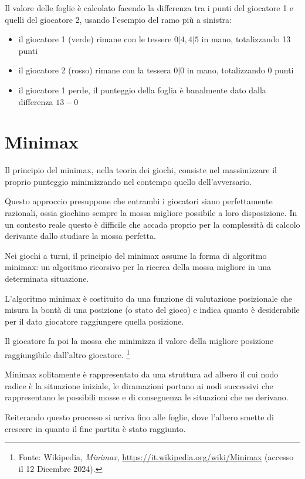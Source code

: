 \documentclass[a4paper,12pt]{report}
\begin{document}
Il valore delle foglie è calcolato facendo la differenza tra i punti del giocatore 1 e quelli del giocatore 2, usando l'esempio del ramo più a sinistra:

\begin{itemize}
    \item il giocatore 1 (verde) rimane con le tessere \( 0|4, 4|5\) in mano, totalizzando 13 punti
    \item il giocatore 2 (rosso) rimane con la tessera \(0|0\) in mano, totalizzando 0 punti
    \item il giocatore 1 perde, il punteggio della foglia è banalmente dato dalla differenza \(13 - 0\)
\end{itemize}


\section{Minimax}

Il principio del minimax, nella teoria dei giochi, consiste nel massimizzare il proprio punteggio minimizzando nel contempo quello dell'avversario.

Questo approccio presuppone che entrambi i giocatori siano perfettamente razionali, ossia giochino sempre la mossa migliore possibile a loro disposizione.
In un contesto reale questo è difficile che accada proprio per la complessità di calcolo derivante dallo studiare la mossa perfetta.

Nei giochi a turni, il principio del minimax assume la forma di algoritmo minimax: un algoritmo ricorsivo per la ricerca della mossa migliore in una determinata situazione. 

L'algoritmo minimax è costituito da una funzione di valutazione posizionale che misura la bontà di una posizione (o stato del gioco) e indica quanto è desiderabile per il dato giocatore raggiungere quella posizione.

Il giocatore fa poi la mossa che minimizza il valore della migliore posizione raggiungibile dall'altro giocatore. \footnote{Fonte: Wikipedia, \emph{Minimax}, \url{https://it.wikipedia.org/wiki/Minimax} (accesso il 12 Dicembre 2024).}

Minimax solitamente è rappresentato da una struttura ad albero il cui nodo radice è la situazione iniziale, le diramazioni portano ai nodi successivi che rappresentano le possibili mosse e di conseguenza le situazioni che ne derivano.

Reiterando questo processo si arriva fino alle foglie, dove l'albero smette di crescere in quanto il fine partita è stato raggiunto.
\end{document}
